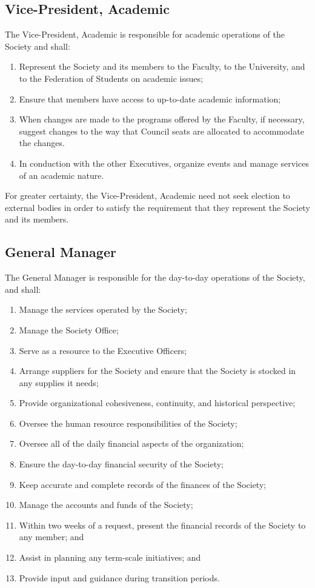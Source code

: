 \subsection{Vice-President, Academic}
The Vice-President, Academic is responsible for academic operations of the
Society and shall:
\begin{enumerate}
  \item Represent the Society and its members to the Faculty, to the University,
    and to the Federation of Students on academic issues;
  \item Ensure that members have access to up-to-date academic information;
  \item When changes are made to the programs offered by the Faculty, if
    necessary, suggest changes to the way that Council seats are allocated to
    accommodate the changes.
  \item In conduction with the other Executives, organize events and manage
    services of an academic nature.
\end{enumerate}

For greater certainty, the Vice-President, Academic need not seek election to
external bodies in order to satisfy the requirement that they represent the
Society and its members.

\subsection{General Manager}
The General Manager is responsible for the day-to-day operations of the 
Society, and shall:
\begin{enumerate}
    \item Manage the services operated by the Society;
    \item Manage the Society Office;
    \item Serve as a resource to the Executive Officers;
    \item Arrange suppliers for the Society and ensure that the Society is
        stocked in any supplies it needs;
    \item Provide organizational cohesiveness, continuity, and historical
        perspective;
    \item Oversee the human resource responsibilities of the Society;
    \item Oversee all of the daily financial aspects of the organization;
    \item Ensure the day-to-day financial security of the Society;
    \item Keep accurate and complete records of the finances of the Society;
    \item Manage the accounts and funds of the Society;
    \item Within two weeks of a request, present the financial records of the
        Society to any member; and
    \item Assist in planning any term-scale initiatives; and
    \item Provide input and guidance during transition periods.
\end{enumerate}

